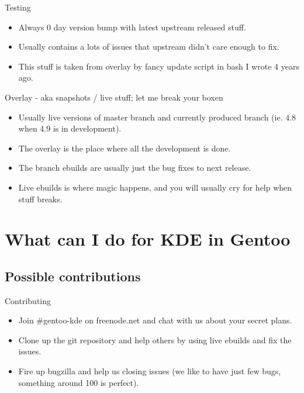 \documentclass{beamer}
\begin{document}
\begin{frame}{Testing}
	\begin{itemize}
		\item Always 0 day version bump with latest upstream released stuff.
		\item Usually contains a lots of issues that upstream didn't care enough to fix.
		\item This stuff is taken from overlay by fancy update script in bash I wrote 4 years ago.
	\end{itemize}
\end{frame}

\begin{frame}{Overlay - aka snapshots / live stuff; let me break your boxen}
	\begin{itemize}
		\item Usually live versions of master branch and currently produced branch (ie. 4.8 when 4.9 is in development).
		\item The overlay is the place where all the development is done.
		\item The branch ebuilds are usually just the bug fixes to next release.
		\item Live ebuilds is where magic happens, and you will usually cry for help when stuff breaks.
	\end{itemize}
\end{frame}

\section{What can I do for KDE in Gentoo}

\subsection{Possible contributions}

\begin{frame}{Contributing}
	\begin{itemize}
		\item Join \#gentoo-kde on freenode.net and chat with us about your secret plans.
		\item Clone up the git repository and help others by using live ebuilds and fix the issues.
		\item Fire up bugzilla and help us closing issues (we like to have just few bugs, something around 100 is perfect).
	\end{itemize}
\end{frame}
\end{document}
